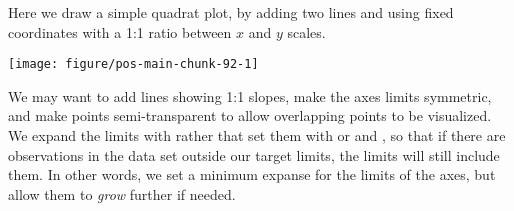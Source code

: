 \documentclass[krantz2]{krantz}\usepackage{knitr}%
\begin{document}
\begin{knitrout}\footnotesize
{}\color{fgcolor}\begin{kframe}
\begin{alltt}
\hlstd{(}\hlstd{)}
 \hlkwb{<-} \hlstd{(}\hlstd{,}  \hlstd{=} \hlstd{)}
 \hlkwb{<-} \hlstd{(} 
                               \hlstd{=} \hlstd{(}\hlstd{,}  \hlstd{=} \hlstd{)} \hlopt{+}  \hlopt{*} 
\end{alltt}
\end{kframe}
\end{knitrout}

Here we draw a simple quadrat plot, by adding two lines and using fixed coordinates with a 1:1 ratio between $x$ and $y$ scales.

\begin{knitrout}\footnotesize
{}\color{fgcolor}\begin{kframe}
\begin{alltt}
\hlstd{(}   \hlopt{+}
    \hlstd{(} \hlstd{=} \hlstd{)} \hlopt{+}
    \hlstd{(} \hlstd{=} \hlstd{)} \hlopt{+}
    \hlstd{()} \hlopt{+}
    \hlstd{(} \hlstd{=} \hlstd{)} \hlopt{+}
    \hlstd{()}
\end{alltt}
\end{kframe}

{\centering \texttt{[image: figure/pos-main-chunk-92-1]} 

}



\end{knitrout}

We may want to add lines showing 1:1 slopes, make the axes limits symmetric, and make points semi-transparent to allow overlapping points to be visualized. We expand the limits with  rather that set them with  or  and , so that if there are observations in the data set outside our target limits, the limits will still include them. In other words, we set a minimum expanse for the limits of the axes, but allow them to \emph{grow} further if needed.
\end{document}
